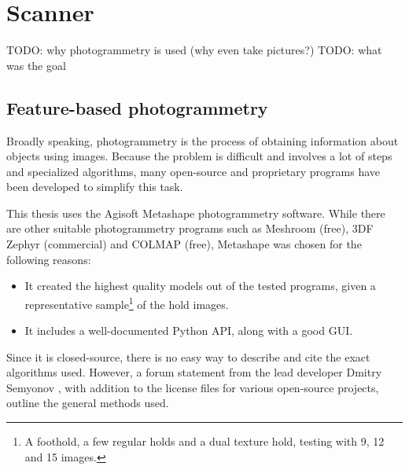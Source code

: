 \chapter{Scanner}\label{sec:scanner}
TODO: why photogrammetry is used (why even take pictures?)
TODO: what was the goal

% 

\section{Feature-based photogrammetry}
Broadly speaking, photogrammetry is the process of obtaining information about objects using images.
Because the problem is difficult and involves a lot of steps and specialized algorithms, many open-source and proprietary programs have been developed to simplify this task.

This thesis uses the Agisoft Metashape photogrammetry software.
While there are other suitable photogrammetry programs such as Meshroom (free), 3DF Zephyr (commercial) and COLMAP (free), Metashape was chosen for the following reasons:
\begin{itemize}
	\item It created the highest quality models out of the tested programs, given a representative sample\footnote{A foothold, a few regular holds and a dual texture hold, testing with 9, 12 and 15 images.} of the hold images.
	\item It includes a well-documented Python API, along with a good GUI.
\end{itemize}

Since it is closed-source, there is no easy way to describe and cite the exact algorithms used.
However, a forum statement from the lead developer Dmitry Semyonov \parencite{metashapeForumPost}, with addition to the license files for various open-source projects, outline the general methods used.

